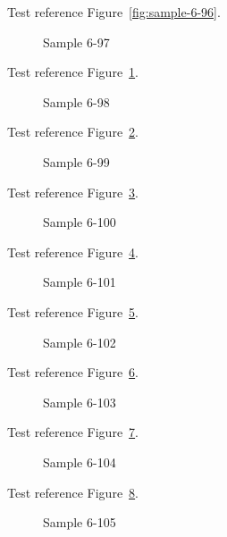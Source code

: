 Test reference Figure~\ref{fig:sample-6-96}.

\begin{figure}[tbhp]
\caption{Sample 6-97}
\label{fig:sample-6-97}
\end{figure}

Test reference Figure~\ref{fig:sample-6-97}.

\begin{figure}[tbhp]
\caption{Sample 6-98}
\label{fig:sample-6-98}
\end{figure}

Test reference Figure~\ref{fig:sample-6-98}.

\begin{figure}[tbhp]
\caption{Sample 6-99}
\label{fig:sample-6-99}
\end{figure}

Test reference Figure~\ref{fig:sample-6-99}.

\begin{figure}[tbhp]
\caption{Sample 6-100}
\label{fig:sample-6-100}
\end{figure}

Test reference Figure~\ref{fig:sample-6-100}.

\begin{figure}[tbhp]
\caption{Sample 6-101}
\label{fig:sample-6-101}
\end{figure}

Test reference Figure~\ref{fig:sample-6-101}.

\begin{figure}[tbhp]
\caption{Sample 6-102}
\label{fig:sample-6-102}
\end{figure}

Test reference Figure~\ref{fig:sample-6-102}.

\begin{figure}[tbhp]
\caption{Sample 6-103}
\label{fig:sample-6-103}
\end{figure}

Test reference Figure~\ref{fig:sample-6-103}.

\begin{figure}[tbhp]
\caption{Sample 6-104}
\label{fig:sample-6-104}
\end{figure}

Test reference Figure~\ref{fig:sample-6-104}.

\begin{figure}[tbhp]
\caption{Sample 6-105}
\label{fig:sample-6-105}
\end{figure}

